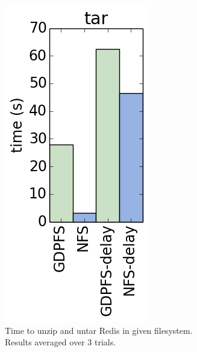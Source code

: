 \documentclass{acm_proc_article-sp}
\begin{document}
\begin{figure}[t]
\begin{subfigure}[b]{0.2\textwidth}
    \includegraphics[width=.8\columnwidth]{tar.png}
    \caption{Time to unzip and untar Redis in given filesystem. Results averaged over 3 trials.\label{fig:tar}}
  \end{subfigure}
  ~
  \begin{subfigure}[b]{0.24\textwidth}
    \centering

\end{subfigure}
\end{figure}
\end{document}
